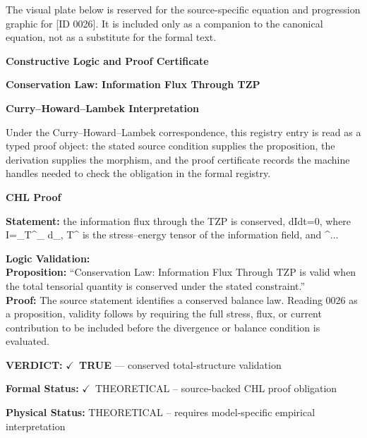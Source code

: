 \begingroup\footnotesize\sloppy
The visual plate below is reserved for the source-specific equation and progression graphic for [ID 0026]. It is included only as a companion to the canonical equation, not as a substitute for the formal text.
\par\endgroup
\ifTZPDarkEdition
{}
\fi

\clearpage
\begingroup\tzpsupportsetup
\noindent\textbf{\fontsize{10.8pt}{12.8pt}\selectfont [ID 0026] Constructive Logic and Proof Certificate}\par
\noindent\textbf{\fontsize{10pt}{12pt}\selectfont Conservation Law: Information Flux Through TZP}\par
\vspace{0.45em}
\begingroup
\footnotesize
\setlength{\parskip}{0.22em}
\setlength{\parindent}{0pt}
\noindent\textbf{Curry--Howard--Lambek Interpretation}\par
Under the Curry--Howard--Lambek correspondence, this registry entry is read as a typed proof
object: the stated source condition supplies the proposition, the derivation supplies the
morphism, and the proof certificate records the machine handles needed to check the obligation
in the formal registry.

\vspace{0.45em}
\noindent\textbf{CHL Proof}\par
\textbf{Statement:} the information flux through the TZP is conserved, dIdt=0, where I=\_T\textasciicircum{}\_ d\_, T\textasciicircum{} is
the stress--energy tensor of the information field, and \textasciicircum{}...

\textbf{Logic Validation:}\\
\textbf{Proposition:} ``Conservation Law: Information Flux Through TZP is valid when the total tensorial
quantity is conserved under the stated constraint.''\\
\textbf{Proof:} The source statement identifies a conserved balance law. Reading 0026 as a proposition,
validity follows by requiring the full stress, flux, or current contribution to be
included before the divergence or balance condition is evaluated.

\textbf{VERDICT:} \ensuremath{\checkmark}\ \textbf{TRUE} --- conserved total-structure validation

\textbf{Formal Status:} \ensuremath{\checkmark}\ THEORETICAL -- source-backed CHL proof obligation

\textbf{Physical Status:} THEORETICAL -- requires model-specific empirical interpretation
\par\vspace{0.45em}
\par
\ifTZPDarkEdition
{}
\fi
\endgroup
\endgroup
